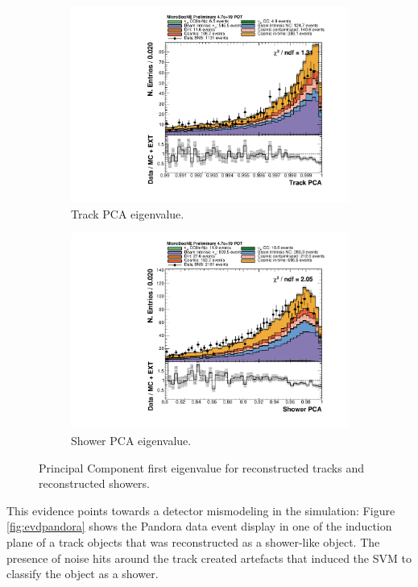 \begin{figure}[htbp]
\centering
  \begin{subfigure}{0.45\textwidth}
    \includegraphics[width=\linewidth]{figures/h_track_pca.pdf}
    \caption{Track PCA eigenvalue.} 
  \end{subfigure}
    \begin{subfigure}{0.45\textwidth}
    \includegraphics[width=\linewidth]{figures/h_shower_pca.pdf}
    \caption{Shower PCA eigenvalue.} 
  \end{subfigure}
  \caption{Principal Component first eigenvalue for reconstructed tracks and reconstructed showers.}\label{fig:pca}
\end{figure}

This evidence points towards a detector mismodeling in the simulation: Figure \ref{fig:evdpandora} shows the Pandora data event display in one of the induction plane of a track objects that was reconstructed as a shower-like object. The presence of noise hits around the track created artefacts that induced the SVM to classify the object as a shower.

